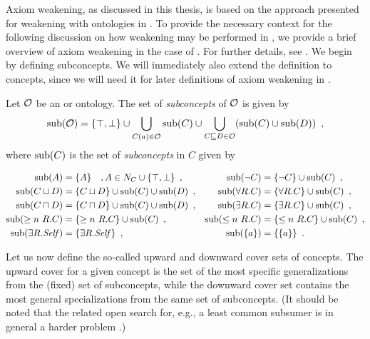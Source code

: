 
Axiom weakening, as discussed in this thesis, is based on the approach presented for weakening with \ALC ontologies in \cite{troquard2018repairing}. To provide the necessary context for the following discussion on how weakening may be performed in \SROIQ, we provide a brief overview of axiom weakening in the case of \ALC. For further details, see \cite{troquard2018repairing}.
%
We begin by defining subconcepts. We will immediately also extend the definition to \SROIQ concepts, since we will need it for later definitions of axiom weakening in \SROIQ.

\begin{definition}
  Let $\mathcal{O}$ be an \ALC or \SROIQ ontology. The set of \emph{subconcepts} of $\mathcal{O}$ is given by
  \begin{align*}
    {\ensuremath{\operatorname{sub}}}(\mathcal{O}) = \{\top, \bot\} \cup \bigcup_{C(a) \in \mathcal{O}} {\operatorname{sub}}(C) \cup \bigcup_{C \sqsubseteq D \in \mathcal{O}} ( {\operatorname{sub}}(C) \cup {\ensuremath{\operatorname{sub}}}(D) ) \enspace,
  \end{align*}
  where ${\operatorname{sub}}(C)$ is the set of \emph{subconcepts} in $C$ given by
  \begin{widepage}
    \vspace{-5mm}
    \begin{align*}
      {\ensuremath{\operatorname{sub}}}(A) &= \{ A \} \quad , A \in N_C \cup \{ \top, \bot \} \enspace, &
      {\operatorname{sub}}(\lnot C) &= \{ \lnot C \} \cup {\ensuremath{\operatorname{sub}}}(C) \enspace, \\
      {\operatorname{sub}}(C \sqcup D) &= \{ C \sqcup D \} \cup {\ensuremath{\operatorname{sub}}}(C) \cup {\ensuremath{\operatorname{sub}}}(D) \enspace, &
      {\operatorname{sub}}(\forall R.C) &= \{ \forall R.C \} \cup {\ensuremath{\operatorname{sub}}}(C) \enspace, \\
      {\operatorname{sub}}(C \sqcap D) &= \{ C \sqcap D \} \cup {\ensuremath{\operatorname{sub}}}(C) \cup {\ensuremath{\operatorname{sub}}}(D) \enspace, &
      {\operatorname{sub}}(\exists R.C) &= \{ \exists R.C \} \cup {\ensuremath{\operatorname{sub}}}(C) \enspace, \\
      {\operatorname{sub}}(\geq n~R.C) &= \{ \geq n~R.C \} \cup {\ensuremath{\operatorname{sub}}}(C) \enspace, &
      {\operatorname{sub}}(\leq n~R.C) &= \{ \leq n~R.C \} \cup {\ensuremath{\operatorname{sub}}}(C) \enspace, \\
      {\operatorname{sub}}(\exists R.\mathit{Self}) &= \{ \exists R.\mathit{Self} \} \enspace, &
      {\operatorname{sub}}(\{a\}) &= \{ \{a\} \} \enspace.
    \end{align*}
  \end{widepage}
\end{definition}

Let us now define the so-called upward and downward cover sets of concepts. The upward cover for a given concept is the set of the most specific generalizations from the (fixed) set of subconcepts, while the downward cover set contains the most general specializations from the same set of subconcepts. (It should be noted that the related open search for, e.g., a least common subsumer is in general a harder problem \cite{baader2003least}.)

